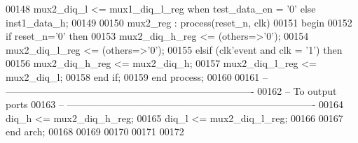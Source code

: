 \begin{DoxyCode}
00148 \textcolor{vhdlchar}{mux2_diq_l} \textcolor{vhdlchar}{<=} \textcolor{vhdlchar}{mux1_diq_l_reg} \textcolor{keywordflow}{when} \textcolor{vhdlchar}{test_data_en} \textcolor{vhdlchar}{=} \textcolor{vhdlchar}{'}\textcolor{vhdllogic}{}\textcolor{vhdllogic}{0}\textcolor{vhdlchar}{'} \textcolor{keywordflow}{else} \textcolor{vhdlchar}{inst1_data_h};
00149 
00150  mux2\_reg : \textcolor{keywordflow}{process}(reset_n, clk)
00151 \textcolor{vhdlkeyword}{    begin}
00152       \textcolor{keywordflow}{if} \textcolor{vhdlchar}{reset_n}\textcolor{vhdlchar}{=}\textcolor{vhdlchar}{'}\textcolor{vhdllogic}{}\textcolor{vhdllogic}{0}\textcolor{vhdlchar}{'} \textcolor{keywordflow}{then}
00153          \textcolor{vhdlchar}{mux2_diq_h_reg} \textcolor{vhdlchar}{<=} \textcolor{vhdlchar}{(}\textcolor{keywordflow}{others}\textcolor{vhdlchar}{=}\textcolor{vhdlchar}{>}\textcolor{vhdlchar}{'}\textcolor{vhdllogic}{}\textcolor{vhdllogic}{0}\textcolor{vhdlchar}{'}\textcolor{vhdlchar}{)};
00154          \textcolor{vhdlchar}{mux2_diq_l_reg} \textcolor{vhdlchar}{<=} \textcolor{vhdlchar}{(}\textcolor{keywordflow}{others}\textcolor{vhdlchar}{=}\textcolor{vhdlchar}{>}\textcolor{vhdlchar}{'}\textcolor{vhdllogic}{}\textcolor{vhdllogic}{0}\textcolor{vhdlchar}{'}\textcolor{vhdlchar}{)};
00155       \textcolor{keywordflow}{elsif} \textcolor{vhdlchar}{(}\textcolor{vhdlchar}{clk}\textcolor{vhdlchar}{'}\textcolor{vhdlkeyword}{event} \textcolor{keywordflow}{and} \textcolor{vhdlchar}{clk} \textcolor{vhdlchar}{=} \textcolor{vhdlchar}{'}\textcolor{vhdllogic}{}\textcolor{vhdllogic}{1}\textcolor{vhdlchar}{'}\textcolor{vhdlchar}{)} \textcolor{keywordflow}{then}
00156           \textcolor{vhdlchar}{mux2_diq_h_reg} \textcolor{vhdlchar}{<=} \textcolor{vhdlchar}{mux2_diq_h};
00157           \textcolor{vhdlchar}{mux2_diq_l_reg} \textcolor{vhdlchar}{<=} \textcolor{vhdlchar}{mux2_diq_l};         
00158         \textcolor{keywordflow}{end} \textcolor{keywordflow}{if};
00159     \textcolor{keywordflow}{end} \textcolor{keywordflow}{process};
00160     
00161 \textcolor{keyword}{-- ----------------------------------------------------------------------------}
00162 \textcolor{keyword}{-- To output ports}
00163 \textcolor{keyword}{-- ----------------------------------------------------------------------------     }
00164 \textcolor{vhdlchar}{diq_h} \textcolor{vhdlchar}{<=} \textcolor{vhdlchar}{mux2_diq_h_reg};
00165 \textcolor{vhdlchar}{diq_l} \textcolor{vhdlchar}{<=} \textcolor{vhdlchar}{mux2_diq_l_reg}; 
00166   
00167 \textcolor{keywordflow}{end} \textcolor{vhdlchar}{arch};   
00168 
00169 
00170 
00171 
00172 
\end{DoxyCode}
